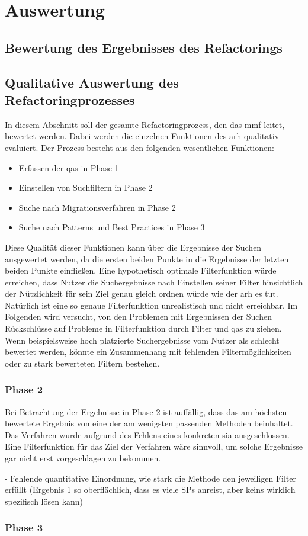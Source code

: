 \chapter{Auswertung}
\label{chap:auswertung}

\section{Bewertung des Ergebnisses des Refactorings}

\section{Qualitative Auswertung des Refactoringprozesses}

In diesem Abschnitt soll der gesamte Refactoringprozess, den das \gls{mmf} leitet, bewertet werden.
Dabei werden die einzelnen Funktionen des \gls{arh} qualitativ evaluiert.
Der Prozess besteht aus den folgenden wesentlichen Funktionen:
\begin{itemize}
	\item Erfassen der \glspl{qa} in Phase 1
	\item Einstellen von Suchfiltern in Phase 2
	\item Suche nach Migrationsverfahren in Phase 2
	\item Suche nach Patterns und Best Practices in Phase 3
\end{itemize}

Diese Qualität dieser Funktionen kann über die Ergebnisse der Suchen ausgewertet werden, da die ersten beiden Punkte in die Ergebnisse der letzten beiden Punkte einfließen.
Eine hypothetisch optimale Filterfunktion würde erreichen, dass Nutzer die Suchergebnisse nach Einstellen seiner Filter hinsichtlich der Nützlichkeit für sein Ziel genau gleich ordnen würde wie der \gls{arh} es tut.
Natürlich ist eine so genaue Filterfunktion unrealistisch und nicht erreichbar.
Im Folgenden wird versucht, von den Problemen mit Ergebnissen der Suchen Rückschlüsse auf Probleme in Filterfunktion durch Filter und \glspl{qa} zu ziehen.
Wenn beispielsweise hoch platzierte Suchergebnisse vom Nutzer als schlecht bewertet werden, könnte ein Zusammenhang mit fehlenden Filtermöglichkeiten oder zu stark bewerteten Filtern bestehen.

\subsection{Phase 2}

Bei Betrachtung der Ergebnisse in Phase 2 ist auffällig, dass das am höchsten bewertete Ergebnis von  eine der am wenigsten passenden Methoden beinhaltet.
Das Verfahren wurde aufgrund des Fehlens eines konkreten \gls{sia} ausgeschlossen.
Eine Filterfunktion für das Ziel der Verfahren wäre sinnvoll, um solche Ergebnisse gar nicht erst vorgeschlagen zu bekommen.

 - Fehlende quantitative Einordnung, wie stark die Methode den jeweiligen Filter erfüllt (Ergebnis 1 so oberflächlich, dass es viele SPs anreist, aber keins wirklich spezifisch lösen kann)

\subsection{Phase 3}


